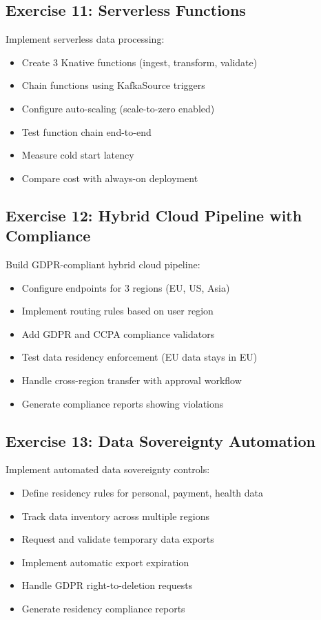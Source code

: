 \subsection{Exercise 11: Serverless Functions}

Implement serverless data processing:
\begin{itemize}
    \item Create 3 Knative functions (ingest, transform, validate)
    \item Chain functions using KafkaSource triggers
    \item Configure auto-scaling (scale-to-zero enabled)
    \item Test function chain end-to-end
    \item Measure cold start latency
    \item Compare cost with always-on deployment
\end{itemize}

\subsection{Exercise 12: Hybrid Cloud Pipeline with Compliance}

Build GDPR-compliant hybrid cloud pipeline:
\begin{itemize}
    \item Configure endpoints for 3 regions (EU, US, Asia)
    \item Implement routing rules based on user region
    \item Add GDPR and CCPA compliance validators
    \item Test data residency enforcement (EU data stays in EU)
    \item Handle cross-region transfer with approval workflow
    \item Generate compliance reports showing violations
\end{itemize}

\subsection{Exercise 13: Data Sovereignty Automation}

Implement automated data sovereignty controls:
\begin{itemize}
    \item Define residency rules for personal, payment, health data
    \item Track data inventory across multiple regions
    \item Request and validate temporary data exports
    \item Implement automatic export expiration
    \item Handle GDPR right-to-deletion requests
    \item Generate residency compliance reports
\end{itemize}

